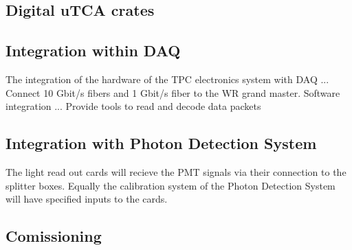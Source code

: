 \subsection{Digital uTCA crates}
\label{sec:fddp-tpc-elec-install-utca}



\subsection{Integration within DAQ}
\label{sec:fddp-tpc-elec-install-daq}
The integration of the hardware of the TPC electronics system with DAQ ... Connect 10 Gbit/s fibers and 1 Gbit/s fiber to the WR grand master.
Software integration ... Provide tools to read and decode data packets

\subsection{Integration with Photon Detection System}
\label{sec:fddp-tpc-elec-install-pmt}
The light read out cards will recieve the PMT signals via their connection to the splitter boxes. Equally the calibration system of the Photon Detection System will have specified inputs to the cards.



\subsection{Comissioning}
\label{sec:fddp-tpc-elec-install-calib}

